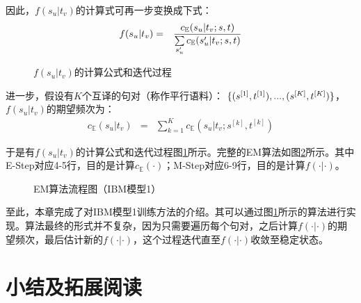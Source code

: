 \vspace{-0.5em}
\parinterval 因此，$f(s_u|t_v)$的计算式可再一步变换成下式：
\vspace{-0.5em}
\begin{eqnarray}
f(s_u|t_v)&=&\frac{c_{\mathbb{E}}(s_u|t_v;{s},{t})}  { \sum\limits_{s'_u} c_{\mathbb{E}}(s'_u|t_v;{s},{t}) }
\label{eq:5-44}
\end{eqnarray}
\begin{figure}[htp]
    \centering

   \caption{$f(s_u|t_v)$的计算公式和迭代过程}
   \label{fig:5-27}
\end{figure}

\vspace{-0.5em}
\parinterval 进一步，假设有$K$个互译的句对（称作平行语料）：
\vspace{-0.5em}
$\{({s}^{[1]},{t}^{[1]}),...,({s}^{[K]},{t}^{[K]})\}$，$f(s_u|t_v)$的期望频次为：
\begin{eqnarray}
c_{\mathbb{E}}(s_u|t_v)&=&\sum\limits_{k=1}^{K}  c_{\mathbb{E}}(s_u|t_v;s^{[k]},t^{[k]})
\label{eq:5-45}
\end{eqnarray}

\parinterval 于是有$f(s_u|t_v)$的计算公式和迭代过程图\ref{fig:5-27}所示。完整的EM算法如图\ref{fig:5-28}所示。其中E-Step对应4-5行，目的是计算$c_{\mathbb{E}}(\cdot)$；M-Step对应6-9行，目的是计算$f(\cdot|\cdot)$。

\begin{figure}[htp]
    \centering
    
   \caption{EM算法流程图（IBM模型1）}
   \label{fig:5-28}
\end{figure}

\parinterval 至此，本章完成了对IBM模型1训练方法的介绍。其可以通过图\ref{fig:5-27}所示的算法进行实现。算法最终的形式并不复杂，因为只需要遍历每个句对，之后计算$f(\cdot|\cdot)$的期望频次，最后估计新的$f(\cdot|\cdot)$，这个过程迭代直至$f(\cdot|\cdot)$收敛至稳定状态。


\sectionnewpage
\section{小结及拓展阅读}

